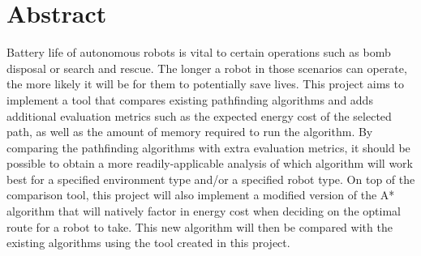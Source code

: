 \chapter*{Abstract} 

Battery life of autonomous robots is vital to certain operations such as bomb
disposal or search and rescue. The longer a robot in those scenarios can operate,
the more likely it will be for them to potentially save lives. This project aims
to implement a tool that compares existing pathfinding algorithms and adds
additional evaluation metrics such as the expected energy cost of the selected
path, as well as the amount of memory required to run the algorithm. By comparing
the pathfinding algorithms with extra evaluation metrics, it should be possible to
obtain a more readily-applicable analysis of which algorithm will work best for a
specified environment type and/or a specified robot type. On top of the comparison
tool, this project will also implement a modified version of the A* algorithm that
will natively factor in energy cost when deciding on the optimal route for a robot
to take. This new algorithm will then be compared with the existing algorithms
using the tool created in this project. 

